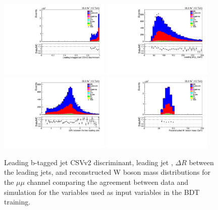 \begin{figure}[h]
\centering
\includegraphics[width=0.47\textwidth]{figs/background-estimation/plots/unblinded/prompt_mumu_ttbarInc/bTagDisc_NPL_mumu_wMass_mumu.pdf}
\includegraphics[width=0.47\textwidth]{figs/background-estimation/plots/unblinded/prompt_mumu_ttbarInc/leadingJetPt_NPL_mumu_wMass_mumu.pdf}
\\
\includegraphics[width=0.47\textwidth]{figs/background-estimation/plots/unblinded/prompt_mumu_ttbarInc/jjDelR_NPL_mumu_wMass_mumu.pdf}
\includegraphics[width=0.47\textwidth]{figs/background-estimation/plots/unblinded/prompt_mumu_ttbarInc/wPairMass_NPL_mumu_wMass_mumu.pdf}
\caption{
Leading b-tagged jet CSVv2 discriminant, leading jet \pT, $\Delta R$ between the leading jets, and reconstructed W boson mass distributions for the $\mu\mu$ channel comparing the agreement between data and simulation for the variables used as input variables in the BDT training.}
\label{fig:inputFeaturesDataSimAgreement2}
\end{figure}

